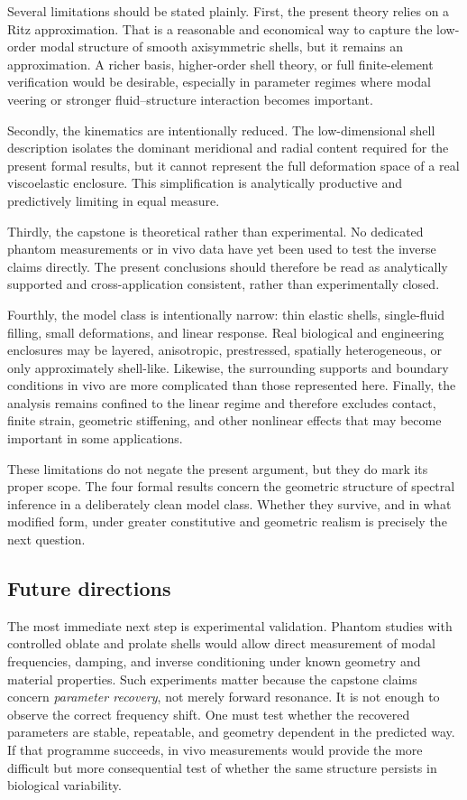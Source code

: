 Several limitations should be stated plainly.  First, the present theory relies
on a Ritz approximation.  That is a reasonable and economical way to capture the
low-order modal structure of smooth axisymmetric shells, but it remains an
approximation.  A richer basis, higher-order shell theory, or full finite-element
verification would be desirable, especially in parameter regimes where modal
veering or stronger fluid--structure interaction becomes important.

Secondly, the kinematics are intentionally reduced.  The low-dimensional shell
description isolates the dominant meridional and radial content required for the
present formal results, but it cannot represent the full deformation space of a
real viscoelastic enclosure.  This simplification is analytically productive and
predictively limiting in equal measure.

Thirdly, the capstone is theoretical rather than experimental.  No dedicated
phantom measurements or in vivo data have yet been used to test the inverse
claims directly.  The present conclusions should therefore be read as
analytically supported and cross-application consistent, rather than
experimentally closed.

Fourthly, the model class is intentionally narrow: thin elastic shells,
single-fluid filling, small deformations, and linear response.  Real biological
and engineering enclosures may be layered, anisotropic, prestressed, spatially
heterogeneous, or only approximately shell-like.  Likewise, the surrounding
supports and boundary conditions in vivo are more complicated than those
represented here.  Finally, the analysis remains confined to the linear regime
and therefore excludes contact, finite strain, geometric stiffening, and other
nonlinear effects that may become important in some applications.

These limitations do not negate the present argument, but they do mark its
proper scope.  The four formal results concern the geometric structure of
spectral inference in a deliberately clean model class.  Whether they survive, and in
what modified form, under greater constitutive and geometric realism is precisely
the next question.

\subsection{Future directions}

The most immediate next step is experimental validation.  Phantom studies with
controlled oblate and prolate shells would allow direct measurement of modal
frequencies, damping, and inverse conditioning under known geometry and material
properties.  Such experiments matter because the capstone claims concern
\emph{parameter recovery}, not merely forward resonance.  It is not enough to
observe the correct frequency shift.  One must test whether the recovered
parameters are stable, repeatable, and geometry dependent in the predicted way.
If that programme succeeds, in vivo measurements would provide the more difficult
but more consequential test of whether the same structure persists in biological
variability.

